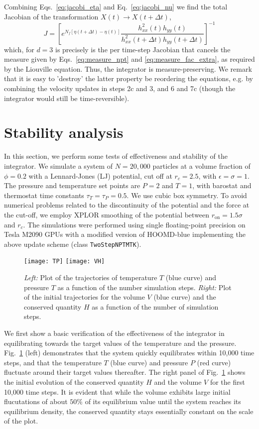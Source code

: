 \documentclass[12pt,letter]{article}
\begin{document}
Combining Eqs.~\eqref{eq:jacobi_eta} and Eq.~\eqref{eq:jacobi_nu} we find the total
Jacobian of the transformation $X(t)\to X(t+\Delta t)$,
\begin{equation}
J = \left[e^{N_f \left[\eta (t + \Delta t) - \eta (t)\right]} \frac{h^2_{xx}(t) h_{yy}(t)}{h^2_{xx}(t+\Delta t) h_{yy}(t+\Delta t)}\right]^{-1}
\end{equation}
which, for $d=3$ is precisely is the per time-step Jacobian that cancels the measure given
by Eqs.~\eqref{eq:measure_npt} and \eqref{eq:measure_fac_extra}, as required by the Liouville equation. Thus, the integrator is measure-preserving. We remark that it is easy
to 'destroy' the latter property be reordering the equations, e.g. by
combining the velocity updates in steps 2c and 3, and 6 and 7c (though
the integrator would still be time-reversible).

\section{Stability analysis}
In this section, we perform some tests of effectiveness and stability
of the integrator. We simulate a system of $N=20,000$ particles at a
volume fraction of $\phi=0.2$ with a Lennard-Jones (LJ) potential, cut
off at $r_c = 2.5$, with $\epsilon=\sigma=1$. The pressure and
temperature set points are $P=2$ and $T=1$, with barostat and
thermostat time constants $\tau_T = \tau_P =0.5$. We use cubic box
symmetry. To avoid numerical problems related to the discontinuity of
the potential and the force at the cut-off, we employ XPLOR smoothing
of the potential between $r_{\mathrm{on}} = 1.5\sigma$ and $r_c$. The
simulations were performed using single floating-point precision on
Tesla M2090 GPUs with a modified version of HOOMD-blue implementing
the above update scheme (class {\tt TwoStepNPTMTK}).

\begin{figure}
\centering\texttt{[image: TP]}
\texttt{[image: VH]}
\caption{{\em Left:} Plot of the trajectories of temperature $T$
(blue curve) and pressure $T$ as a function of the number simulation steps.
{\em Right:} Plot of the initial trajectories for the volume $V$ (blue curve)
and the conserved quantity $H$ as a function of the number of simulation
steps. }
\label{fig:equilibration}
\end{figure}

We first show a basic verification of the effectiveness of the
integrator in equilibrating towards the target values of the
temperature and the pressure. Fig.~\ref{fig:equilibration} (left)
demonstrates that the system quickly equilibrates within 10,000 time
steps, and that the temperature $T$ (blue curve) and pressure $P$ (red
curve) fluctuate around their target values thereafter.  The right
panel of Fig.~\ref{fig:equilibration} shows the initial evolution of
the conserved quantity $H$ and the volume $V$ for the first 10,000
time steps. It is evident that while the volume exhibits large initial
flucutations of about $50\%$ of its equilibrium value until the system
reaches its equilibrium density, the conserved quantity stays
essentially constant on the scale of the plot.
\end{document}
